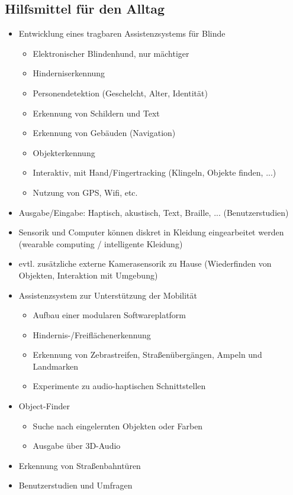 \documentclass[paper=a4, fontsize=11pt]{scrartcl} %
\numberwithin{equation}{section} %
\numberwithin{figure}{section} %
\numberwithin{table}{section} %
\begin{document}
\subsection{Hilfsmittel für den Alltag}

\begin{itemize}
\item Entwicklung eines tragbaren Assistenzsystems für Blinde
\begin{itemize}
\item Elektronischer Blindenhund, nur mächtiger
\item Hinderniserkennung
\item Personendetektion (Geschelcht, Alter, Identität)
\item Erkennung von Schildern und Text
\item Erkennung von Gebäuden (Navigation)
\item Objekterkennung
\item Interaktiv, mit Hand/Fingertracking (Klingeln, Objekte finden, ...)
\item Nutzung von GPS, Wifi, etc.
\end{itemize}
\item Ausgabe/Eingabe: Haptisch, akustisch, Text, Braille, ... (Benutzerstudien)
\item Sensorik und Computer können diskret in Kleidung eingearbeitet werden (wearable computing / intelligente Kleidung)
\item evtl. zusätzliche externe Kamerasensorik zu Hause (Wiederfinden von Objekten, Interaktion mit Umgebung)
\item Assistenzsystem zur Unterstützung der Mobilität
\begin{itemize}
\item Aufbau einer modularen Softwareplatform
\item Hindernis-/Freiflächenerkennung
\item Erkennung von Zebrastreifen, Straßenübergängen, Ampeln und Landmarken
\item Experimente zu audio-haptischen Schnittstellen
\end{itemize}
\item Object-Finder
\begin{itemize}
\item Suche nach eingelernten Objekten oder Farben
\item Ausgabe über 3D-Audio
\end{itemize}
\item Erkennung von Straßenbahntüren
\item Benutzerstudien und Umfragen
\end{itemize}
\end{document}
